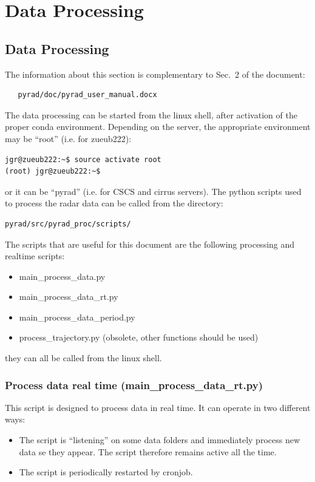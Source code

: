 \documentclass[a4paper,11pt,pdftex,twoside]{scrartcl}
\begin{document}
\section{Data Processing}

\subsection{Data Processing}
The information about this section is complementary to Sec.~2 of the document:

\begin{verbatim}
   pyrad/doc/pyrad_user_manual.docx
\end{verbatim}


The data processing can be started from the linux shell, after activation of the proper conda environment. Depending on the server, the appropriate environment may be  ``root'' (i.e. for zueub222):

\begin{verbatim}
jgr@zueub222:~$ source activate root
(root) jgr@zueub222:~$
\end{verbatim}

\noindent
or it can be ``pyrad'' (i.e. for CSCS and cirrus servers).
The python scripts used to process the radar data can be called from the directory:

\begin{verbatim}
pyrad/src/pyrad_proc/scripts/
\end{verbatim}

\noindent
The scripts that are useful for this document are the following processing and realtime scripts:
\begin{itemize}
   \item main\_process\_data.py
   \item main\_process\_data\_rt.py
   \item main\_process\_data\_period.py
   \item process\_trajectory.py (obsolete, other functions should be used)
\end{itemize}
they can all be called from the linux shell.

\subsubsection{Process data real time (main\_process\_data\_rt.py)}
This script is designed to process data in real time. It can operate in two different ways:
\begin{itemize}
\item The script is ``listening'' on some data folders and immediately process new data se they appear. The script therefore remains active all the time.
\item The script is periodically restarted by cronjob.
\end{itemize}
\end{document}
